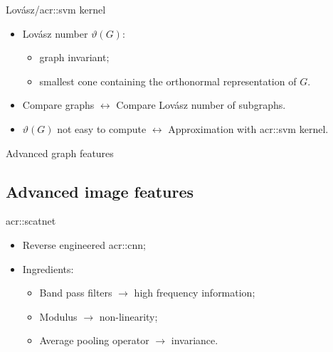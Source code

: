 \documentclass[12pt]{beamer}
\begin{document}
            \begin{frame}{Lov\'asz/\texorpdfstring{\acrshort*{acr::svm}}{SVM} kernel}
                \begin{itemize}[label=\(\blacktriangleright\), font=\color{IGNGreen}, itemsep=2em]
                    \item<1-> Lov\'asz number \(\vartheta\left(G\right)\):
                    \begin{itemize}[label=\(\blacktriangleright\), font=\color{IGNGreen}]
                        \item<2-> graph invariant;
                        \item<3-> smallest cone containing the orthonormal representation of \(G\).
                    \end{itemize}
                    \item<4-> Compare graphs \(\longleftrightarrow\) Compare Lov\'asz number of subgraphs.
                    \item<5-> \(\vartheta\left(G\right)\) not easy to compute \(\longleftrightarrow\) Approximation with \gls{acr::svm} kernel.
                \end{itemize}
            \end{frame}

            \begin{frame}{Advanced graph features}
                \centering
                
            \end{frame}

        \subsection{Advanced image features}
            
            \begin{frame}{\texorpdfstring{\acrshort*{acr::scatnet}}{ScatNet}}
                \begin{itemize}[label=\(\blacktriangleright\), font=\color{IGNGreen}]
                    \item<1-> Reverse engineered \acrfull{acr::cnn};
                    \item<2-> Ingredients: 
                    \begin{itemize}[label=\(\blacktriangleright\), font=\color{IGNGreen}]
                        \item<3-> Band pass filters \(\longrightarrow\) high frequency information;
                        \item<4-> Modulus \(\longrightarrow\) non-linearity;
                        \item<5-> Average pooling operator \(\longrightarrow\) invariance.
                    \end{itemize}
                \end{itemize}
            \end{frame}
            
\end{document}
